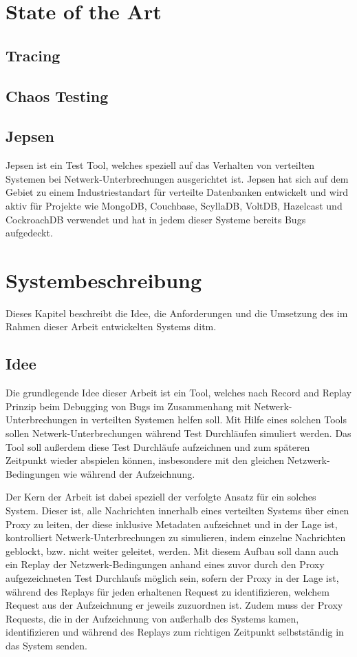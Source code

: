 \documentclass[a4paper]{report}
\begin{document}
\chapter{State of the Art}
\cite{debugging_distributed_systems_2016}
\section{Tracing}
\section{Chaos Testing}
\cite{why_is_random_testing_effective}
\section{Jepsen}
\cite{abstracting_the_geniuses}

Jepsen ist ein Test Tool, welches speziell auf das Verhalten von verteilten Systemen bei Netwerk-Unterbrechungen ausgerichtet ist.
Jepsen hat sich auf dem Gebiet zu einem Industriestandart für verteilte Datenbanken entwickelt und wird aktiv für Projekte wie
MongoDB, Couchbase, ScyllaDB, VoltDB, Hazelcast und CockroachDB verwendet und hat in jedem dieser Systeme bereits Bugs aufgedeckt.

\chapter{Systembeschreibung}
Dieses Kapitel beschreibt die Idee, die Anforderungen und die Umsetzung des im Rahmen dieser Arbeit entwickelten Systems ditm.
\section{Idee}
Die grundlegende Idee dieser Arbeit ist ein Tool, welches nach Record and Replay Prinzip beim Debugging von Bugs im Zusammenhang
mit Netwerk-Unterbrechungen in verteilten Systemen helfen soll. Mit Hilfe eines solchen Tools sollen Netwerk-Unterbrechungen
während Test Durchläufen simuliert werden. Das Tool soll außerdem diese Test Durchläufe aufzeichnen und zum späteren Zeitpunkt
wieder abspielen können, insbesondere mit den gleichen Netzwerk-Bedingungen wie während der Aufzeichnung.

Der Kern der Arbeit ist dabei speziell der verfolgte Ansatz für ein solches System. Dieser ist, alle Nachrichten innerhalb eines
verteilten Systems über einen Proxy zu leiten, der diese inklusive Metadaten aufzeichnet und in der Lage ist, kontrolliert
Netwerk-Unterbrechungen zu simulieren, indem einzelne Nachrichten geblockt, bzw. nicht weiter geleitet, werden.
Mit diesem Aufbau soll dann auch ein Replay der Netzwerk-Bedingungen anhand eines zuvor durch den Proxy aufgezeichneten
Test Durchlaufs möglich sein, sofern der Proxy in der Lage ist, während des Replays für jeden erhaltenen Request zu identifizieren,
welchem Request aus der Aufzeichnung er jeweils zuzuordnen ist. Zudem muss der Proxy Requests, die in der Aufzeichnung von
außerhalb des Systems kamen, identifizieren und während des Replays zum richtigen Zeitpunkt selbstständig in das System senden.
\end{document}
